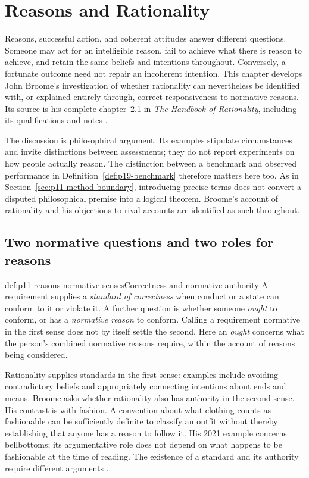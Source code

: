 \chapter{Reasons and Rationality}
\label{sec:p11-reasons-and-rationality}

Reasons, successful action, and coherent attitudes answer different questions.
Someone may act for an intelligible reason, fail to achieve what there is reason
to achieve, and retain the same beliefs and intentions throughout. Conversely,
a fortunate outcome need not repair an incoherent intention. This chapter
develops John Broome's investigation of whether rationality can nevertheless
be identified with, or explained entirely through, correct responsiveness to
normative reasons. Its source is his complete chapter~2.1 in
\emph{The Handbook of Rationality}, including its qualifications and notes
\parencite[pp.~129--136]{Broome2021ReasonsRationality}.

The discussion is philosophical argument. Its examples stipulate circumstances
and invite distinctions between assessments; they do not report experiments
on how people actually reason. The distinction between a benchmark and
observed performance in Definition~\ref{def:p19-benchmark} therefore matters
here too. As in Section~\ref{sec:p11-method-boundary}, introducing precise
terms does not convert a disputed philosophical premise into a logical theorem.
Broome's account of rationality and his objections to rival accounts are
identified as such throughout.

\section{Two normative questions and two roles for reasons}
\label{sec:p11-reasons-normativity}

\begin{hbdefinition}{def:p11-reasons-normative-senses}{Correctness and normative authority}
A requirement supplies a \emph{standard of correctness} when conduct or a state
can conform to it or violate it. A further question is whether someone
\emph{ought} to conform, or has a \emph{normative reason} to conform. Calling a
requirement normative in the first sense does not by itself settle the second.
Here an \emph{ought} concerns what the person's combined normative reasons
require, within the account of reasons being considered.
\end{hbdefinition}

Rationality supplies standards in the first sense: examples include avoiding
contradictory beliefs and appropriately connecting intentions about ends and
means. Broome asks whether rationality also has authority in the second sense.
His contrast is with fashion. A convention about what clothing counts as
fashionable can be sufficiently definite to classify an outfit without thereby
establishing that anyone has a reason to follow it. His 2021 example concerns
bellbottoms; its argumentative role does not depend on what happens to be
fashionable at the time of reading. The existence of a standard and its
authority require different arguments
\parencite[p.~129]{Broome2021ReasonsRationality}.

